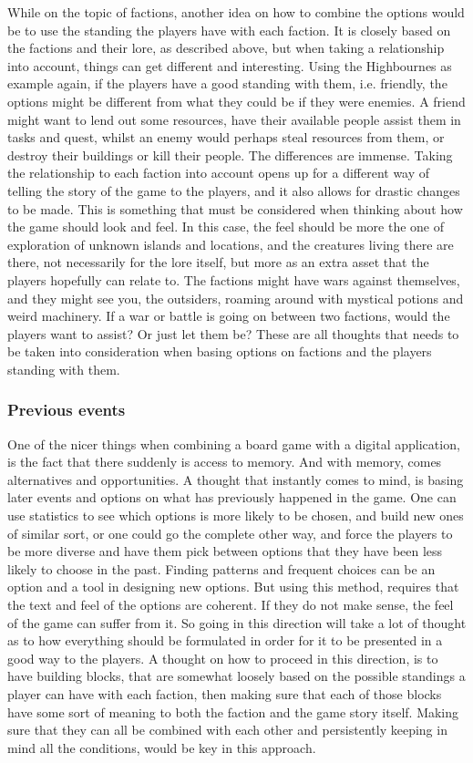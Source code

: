 While on the topic of factions, another idea on how to combine the options would be to use the standing the players have with each faction. It is closely based on the factions and their lore, as described above, but when taking a relationship into account, things can get different and interesting. Using the Highbournes as example again, if the players have a good standing with them, i.e. friendly, the options might be different from what they could be if they were enemies. A friend might want to lend out some resources, have their available people assist them in tasks and quest, whilst an enemy would perhaps steal resources from them, or destroy their buildings or kill their people. The differences are immense. Taking the relationship to each faction into account opens up for a different way of telling the story of the game to the players, and it also allows for drastic changes to be made. This is something that must be considered when thinking about how the game should look and feel. In this case, the feel should be more the one of exploration of unknown islands and locations, and the creatures living there are there, not necessarily for the lore itself, but more as an extra asset that the players hopefully can relate to. The factions might have wars against themselves, and they might see you, the outsiders, roaming around with mystical potions and weird machinery. If a war or battle is going on between two factions, would the players want to assist? Or just let them be? These are all thoughts that needs to be taken into consideration when basing options on factions and the players standing with them.


\subsubsection{Previous events}
One of the nicer things when combining a board game with a digital application, is the fact that there suddenly is access to memory. And with memory, comes alternatives and opportunities. A thought that instantly comes to mind, is basing later events and options on what has previously happened in the game. One can use statistics to see which options is more likely to be chosen, and build new ones of similar sort, or one could go the complete other way, and force the players to be more diverse and have them pick between options that they have been less likely to choose in the past. Finding patterns and frequent choices can be an option and a tool in designing new options. But using this method, requires that the text and feel of the options are coherent. If they do not make sense, the feel of the game can suffer from it. So going in this direction will take a lot of thought as to how everything should be formulated in order for it to be presented in a good way to the players. A thought on how to proceed in this direction, is to have building blocks, that are somewhat loosely based on the possible standings a player can have with each faction, then making sure that each of those blocks have some sort of meaning to both the faction and the game story itself. Making sure that they can all be combined with each other and persistently keeping in mind all the conditions, would be key in this approach.

